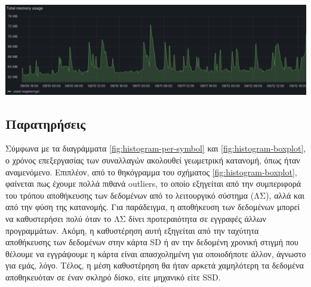 \documentclass[11pt]{article}
\begin{document}
\begin{center}
\includegraphics[width=0.7\linewidth]{./images/memory-usage.png}
\end{center}
\subsection{Παρατηρήσεις}
\label{sec:orgaa643ff}
Σύμφωνα με τα διαγράμματα \ref{fig:histogram-per-symbol} και \ref{fig:histogram-boxplot}, ο χρόνος επεξεργασίας των συναλλαγών ακολουθεί γεωμετρική κατανομή, όπως ήταν αναμενόμενο. Επιπλέον, από το θηκόγραμμα του σχήματος \ref{fig:histogram-boxplot}, φαίνεται πως έχουμε πολλά πιθανά outliers, το οποίο εξηγείται από την συμπεριφορά του τρόπου αποθήκευσης των δεδομένων από το λειτουργικό σύστημα (ΛΣ), αλλά και από την φύση της κατανομής. Για παράδειγμα, η αποθήκευση των δεδομένων μπορεί να καθυστερήσει πολύ όταν το ΛΣ δίνει προτεραιότητα σε εγγραφές άλλων προγραμμάτων. Ακόμη, η καθυστέρηση αυτή εξηγείται από την ταχύτητα αποθήκευσης των δεδομένων στην κάρτα SD ή αν την δεδομένη χρονική στιγμή που θέλουμε να εγγράψουμε η κάρτα είναι απασχολημένη για οποιοδήποτε άλλον, άγνωστο για εμάς, λόγο. Τέλος, η μέση καθυστέρηση θα ήταν αρκετά χαμηλότερη τα δεδομένα αποθηκευόταν σε έναν σκληρό δίσκο, είτε μηχανικό είτε SSD.

\printbibliography[heading=bibnumbered]
\end{document}
